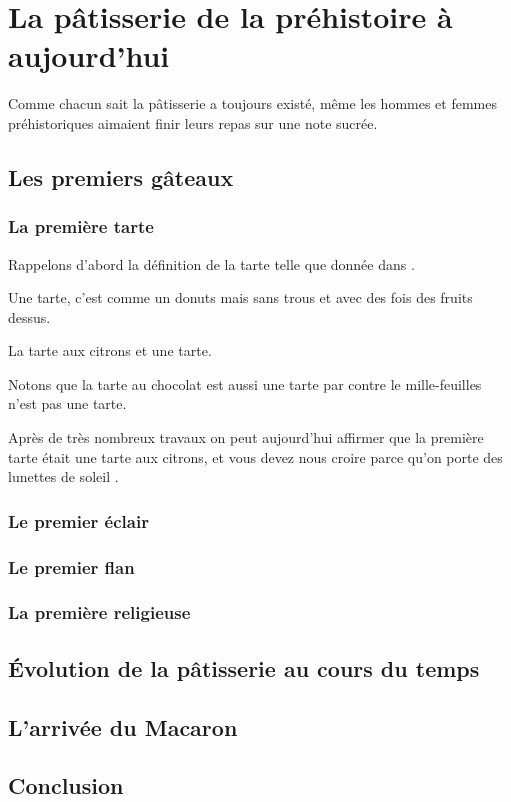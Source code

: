 
\section{La pâtisserie de la préhistoire à aujourd'hui}

Comme chacun sait la pâtisserie a toujours existé, même les hommes et femmes préhistoriques aimaient finir leurs repas sur une note sucrée.

\subsection{Les premiers gâteaux}


\subsubsection{La première tarte}

Rappelons d'abord la définition de la tarte telle que donnée dans \cite{S2012}.

\begin{definition}[Tarte]
  Une tarte, c'est comme un donuts mais sans trous et avec des fois des fruits dessus.
\end{definition}

\begin{example}[Tarte]
  La tarte aux citrons et une tarte.
\end{example}

\begin{remark}
  Notons que la tarte au chocolat est aussi une tarte par contre le mille-feuilles n'est pas une tarte.
\end{remark}

Après de très nombreux travaux on peut aujourd'hui affirmer que la première tarte était une tarte aux citrons, et vous devez nous croire parce qu'on porte des lunettes de soleil \cite{C2012}.

\subsubsection{Le premier éclair}

\subsubsection{Le premier flan}

\subsubsection{La première religieuse}


\subsection{Évolution de la pâtisserie au cours du temps}

\subsection{L'arrivée du Macaron}

\subsection{Conclusion}